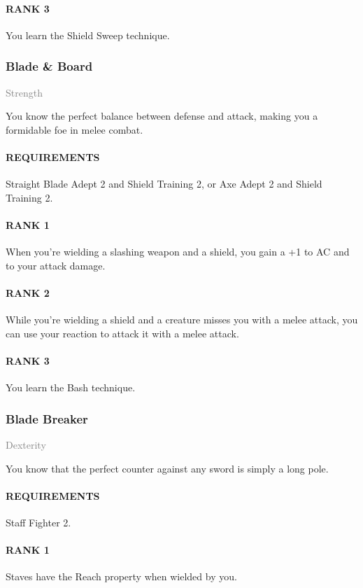 \paragraph{RANK 3} You learn the Shield Sweep technique.

\subsubsection{Blade \& Board} \label{feat::bladeandboard}
\small{\textcolor{gray}{Strength}}

\normalsize
You know the perfect balance between defense and attack, making you a formidable foe in melee combat.
\paragraph{REQUIREMENTS} Straight Blade Adept 2 and Shield Training 2, or Axe Adept 2 and Shield Training 2.
\paragraph{RANK 1} When you're wielding a slashing weapon and a shield, you gain a +1 to AC and to your attack damage.
\paragraph{RANK 2} While you're wielding a shield and a creature misses you with a melee attack, you can use your reaction to attack it with a melee attack.
\paragraph{RANK 3} You learn the Bash technique.

\subsubsection{Blade Breaker} \label{feat::bladebreaker}
\small{\textcolor{gray}{Dexterity}}

\normalsize
You know that the perfect counter against any sword is simply a long pole.
\paragraph{REQUIREMENTS} Staff Fighter 2.
\paragraph{RANK 1} Staves have the Reach property when wielded by you.

